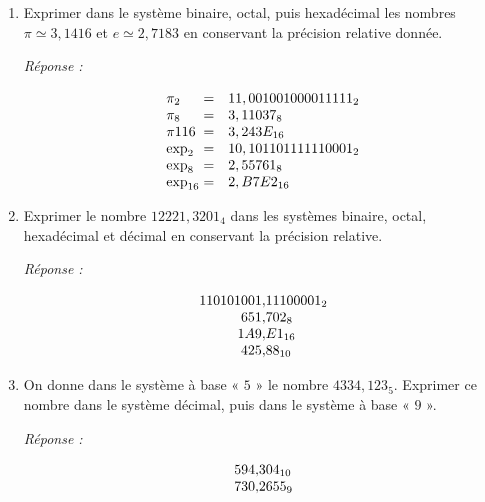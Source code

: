 \begin{enumerate} [label=\arabic*$^\circ$]

\item Exprimer dans le système binaire, octal, puis hexadécimal les nombres $\pi \simeq 3,1416$ et $e \simeq 2,7183$ en conservant la précision relative donnée. 

\textsl{Réponse : }

\medskip

\[
\begin{array}{l@{\hspace*{1mm}}cl}
\pi_2    & = & 11,001001000011111_2 \\
\pi_8    & = & 3,11037_8 \\
\pi1{16} & = & 3,243E_{16} \\
\exp_2   & = & 10, 101101111110001_2 \\
\exp_8   & = & 2,55761_8\\
\exp_{16} & = & 2,B7E2_{16} \\   
\end{array}
\]

\medskip 

\item Exprimer le nombre $12221,3201_4$ dans les systèmes binaire, octal, hexadécimal et décimal en conservant la précision relative. 

\textsl{Réponse : }
\medskip

\[
\begin{array}{r@{\hspace*{0mm}}l}
     110101001,&11100001_2\\
     651,&702_8 \\
     1A9,&E1_{16} \\
     425,&88_{10}\\       
\end{array}
\]

\medskip 


\item On donne dans le système à base « $5$ » le nombre $4334,123_5$. Exprimer ce nombre dans le système décimal, puis dans le système à base « $9$ ».


\textsl{Réponse : }
\medskip

\[
\begin{array}{r@{\hspace*{0mm}}l}
     594,& 304_{10}\\
     730,&2655_9\\    
\end{array}
\]


\end{enumerate}
